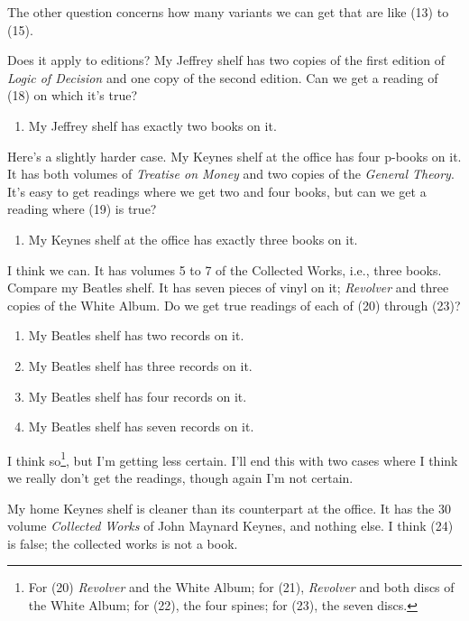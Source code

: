 \documentclass[
  11pt,
  letterpaper,
  DIV=11,
  numbers=noendperiod,
  twoside]{scrartcl}
\providecommand{\tightlist}{%
  \setlength{\itemsep}{0pt}\setlength{\parskip}{0pt}}
\begin{document}
The other question concerns how many variants we can get that are like
(13) to (15).

Does it apply to editions? My Jeffrey shelf has two copies of the first
edition of \emph{Logic of Decision} and one copy of the second edition.
Can we get a reading of (18) on which it's true?

\begin{enumerate}
\def\labelenumi{(\arabic{enumi})}
\setcounter{enumi}{17}
\tightlist
\item
  My Jeffrey shelf has exactly two books on it.
\end{enumerate}

Here's a slightly harder case. My Keynes shelf at the office has four
p-books on it. It has both volumes of \emph{Treatise on Money} and two
copies of the \emph{General Theory}. It's easy to get readings where we
get two and four books, but can we get a reading where (19) is true?

\begin{enumerate}
\def\labelenumi{(\arabic{enumi})}
\setcounter{enumi}{18}
\tightlist
\item
  My Keynes shelf at the office has exactly three books on it.
\end{enumerate}

I think we can. It has volumes 5 to 7 of the Collected Works, i.e.,
three books. Compare my Beatles shelf. It has seven pieces of vinyl on
it; \emph{Revolver} and three copies of the White Album. Do we get true
readings of each of (20) through (23)?

\begin{enumerate}
\def\labelenumi{(\arabic{enumi})}
\setcounter{enumi}{19}
\tightlist
\item
  My Beatles shelf has two records on it.
\item
  My Beatles shelf has three records on it.
\item
  My Beatles shelf has four records on it.
\item
  My Beatles shelf has seven records on it.
\end{enumerate}

I think so\footnote{For (20) \emph{Revolver} and the White Album; for
  (21), \emph{Revolver} and both discs of the White Album; for (22), the
  four spines; for (23), the seven discs.}, but I'm getting less
certain. I'll end this with two cases where I think we really don't get
the readings, though again I'm not certain.

My home Keynes shelf is cleaner than its counterpart at the office. It
has the 30 volume \emph{Collected Works} of John Maynard Keynes, and
nothing else. I think (24) is false; the collected works is not a book.
\end{document}
